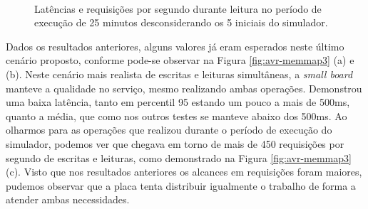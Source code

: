 \documentclass[12pt,english,brazil]{article}
\begin{document}
\begin{figure}[!hb]
  \centering
  \mbox{%
    \qquad
    }
  \caption{Latências e requisições por segundo durante leitura no período de execução de 25 minutos desconsiderando os 5 iniciais do simulador.}
  \label{fig:avr-memmap2}
\end{figure}

Dados os resultados anteriores, alguns valores já eram esperados neste último cenário proposto, conforme pode-se observar na Figura \ref{fig:avr-memmap3} (a) e (b). Neste cenário mais realista de escritas e leituras simultâneas, a \textit{small board} manteve a qualidade no serviço, mesmo realizando ambas operações. Demonstrou uma baixa latência, tanto em percentil 95 estando um pouco a mais de 500ms, quanto a média, que como nos outros testes se manteve abaixo dos 500ms. Ao olharmos para as operações que realizou durante o período de execução do simulador, podemos ver que chegava em torno de mais de 450 requisições por segundo de escritas e leituras, como demonstrado na Figura \ref{fig:avr-memmap3} (c). Visto que nos resultados anteriores os alcances em requisições foram maiores, pudemos observar que a placa tenta distribuir igualmente o trabalho de forma a atender ambas necessidades.
\end{document}
